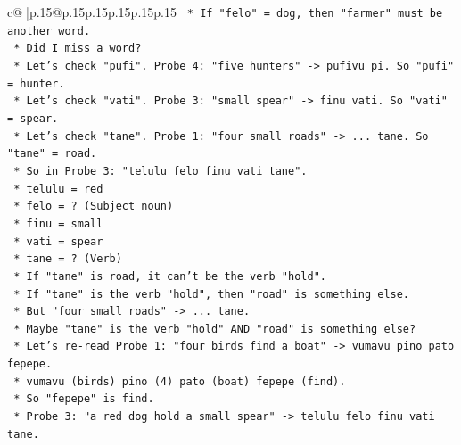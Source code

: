 \documentclass{article}
\begin{document}
{\begin{supertabular}{c@{$\;$}|p{.15\linewidth}@{}p{.15\linewidth}p{.15\linewidth}p{.15\linewidth}p{.15\linewidth}p{.15\linewidth}}
{{{\texttt{                                        *   If "felo" = dog, then "farmer" must be another word.} \\
\texttt{                                        *   Did I miss a word?} \\
\texttt{                                        *   Let's check "pufi". Probe 4: "five hunters" {-}> pufivu pi. So "pufi" = hunter.} \\
\texttt{                                        *   Let's check "vati". Probe 3: "small spear" {-}> finu vati. So "vati" = spear.} \\
\texttt{                                        *   Let's check "tane". Probe 1: "four small roads" {-}> ... tane. So "tane" = road.} \\
\texttt{                                        *   So in Probe 3: "telulu felo finu vati tane".} \\
\texttt{                                            *   telulu = red} \\
\texttt{                                            *   felo = ? (Subject noun)} \\
\texttt{                                            *   finu = small} \\
\texttt{                                            *   vati = spear} \\
\texttt{                                            *   tane = ? (Verb)} \\
\texttt{                                        *   If "tane" is road, it can't be the verb "hold".} \\
\texttt{                                        *   If "tane" is the verb "hold", then "road" is something else.} \\
\texttt{                                        *   But "four small roads" {-}> ... tane.} \\
\texttt{                                        *   Maybe "tane" is the verb "hold" AND "road" is something else?} \\
\texttt{                                        *   Let's re{-}read Probe 1: "four birds find a boat" {-}> vumavu pino pato fepepe.} \\
\texttt{                                            *   vumavu (birds) pino (4) pato (boat) fepepe (find).} \\
\texttt{                                            *   So "fepepe" is find.} \\
\texttt{                                        *   Probe 3: "a red dog hold a small spear" {-}> telulu felo finu vati tane.} \\
}}}
\end{supertabular}}
\end{document}
